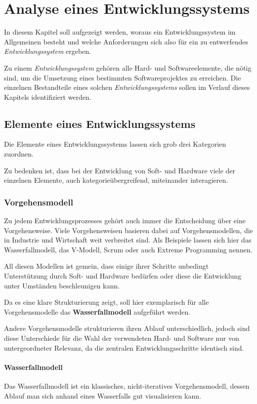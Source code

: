 \chapter{Analyse eines Entwicklungssystems}\label{chap:analyse}
\minitoc
In diesem Kapitel soll aufgezeigt werden, woraus ein Entwicklungssystem
im Allgemeinen besteht und welche Anforderungen sich also für ein zu
entwerfendes \emph{Entwicklungssystem} ergeben.
\begin{definition}[Entwicklungssystem]
Zu einem \emph{Entwicklungssystem} gehören
alle Hard- und Softwareelemente, die nötig sind, um die Umsetzung eines
bestimmten Softwareprojektes zu erreichen. Die einzelnen Bestandteile eines
solchen \emph{Entwicklungssystems} sollen im Verlauf dieses Kapitels
identifiziert werden.
\end{definition}

\section{Elemente eines Entwicklungssystems}
Die Elemente eines Entwicklungssystems lassen sich grob drei Kategorien
zuordnen. 

Zu bedenken ist, dass bei der Entwicklung von Soft- und Hardware viele der
einzelnen Elemente, auch kategorieübergreifend, miteinander interagieren. 
\subsection{Vorgehensmodell}
Zu jedem Entwicklungsprozesses gehört auch immer die Entscheidung über eine
Vorgehensweise. Viele Vorgehensweisen basieren dabei auf Vorgehensmodellen,
die in Industrie und Wirtschaft weit verbreitet sind. Als Beispiele lassen sich
hier das Wasserfallmodell, das V-Modell, Scrum oder auch Extreme Programming
nennen.

All diesen Modellen ist gemein, dass einige ihrer Schritte
unbedingt Unterstützung durch Soft- und Hardware bedürfen oder
diese die Entwicklung unter Umständen beschleunigen kann.

Da es eine klare Strukturierung zeigt, soll hier exemplarisch für alle
Vorgehensmodelle das \textbf{Wasserfallmodell} aufgeführt werden.

Andere Vorgehensmodelle strukturieren ihren Ablauf unterschiedlich, jedoch sind
diese Unterschiede für die Wahl der verwendeten Hard- und Software nur von
untergeordneter Relevanz, da die zentralen Entwicklungsschritte
identisch sind.

\subsubsection*{Wasserfallmodell}
Das Wasserfallmodell ist ein klassisches, nicht-iteratives Vorgehensmodell,
dessen Ablauf man sich anhand eines Wasserfalls gut visualisieren kann. 

